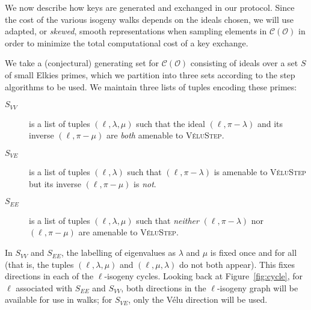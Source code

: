 \documentclass{llncs}
\newcommand{\Cl}{\mathcal{C}}
\renewcommand{\O}{\mathcal{O}}
\newcommand{\algstyle}[1]{\textsc{#1}}
\begin{document}
We now describe how keys are generated and exchanged in our protocol. 
Since the cost of the various isogeny walks depends on the ideals
chosen,
we will use adapted, or \emph{skewed}, 
smooth representations when sampling elements in $\Cl(\O)$
in order to minimize the total computational cost of a key exchange.

We take a (conjectural) generating set for $\Cl(\O)$ consisting of ideals over a set 
$S$ of small Elkies primes,
which we partition into three sets according to the step algorithms to be used.
We maintain three lists of tuples encoding these primes:

\begin{description}
    \item[$S_{VV}$]
        \label{case:velustep-sym}
        is a list of tuples $(\ell,\lambda,\mu)$
        such that the ideal $(\ell,\pi - \lambda)$ 
        and its inverse $(\ell,\pi-\mu)$
        are \emph{both} amenable to \algstyle{VéluStep}.
    \item[$S_{VE}$]
        \label{case:velustep-asym}
        is a list of tuples $(\ell,\lambda)$
        such that $(\ell,\pi-\lambda)$ is amenable to
        \algstyle{VéluStep} but its inverse $(\ell,\pi-\mu)$ is \emph{not}.
    \item[$S_{EE}$]
        \label{case:elkstep} 
        is a list of tuples $(\ell,\lambda,\mu)$
        such that \emph{neither} $(\ell,\pi - \lambda)$ nor $(\ell,\pi-\mu)$
        are amenable to \algstyle{VéluStep}.
\end{description}

In $S_{VV}$ and $S_{EE}$,
the labelling of eigenvalues as $\lambda$ and $\mu$ 
is fixed once and for all 
(that is, the tuples $(\ell,\lambda,\mu)$ and $(\ell,\mu,\lambda)$ do not
both appear).
This fixes directions in each of the $\ell$-isogeny cycles.
Looking back at Figure~\ref{fig:cycle}, 
for $\ell$ associated with $S_{EE}$ and $S_{VV}$, 
both directions in the $\ell$-isogeny graph will be available for use in
walks; for $S_{VE}$, only the Vélu direction will be used.
\end{document}
